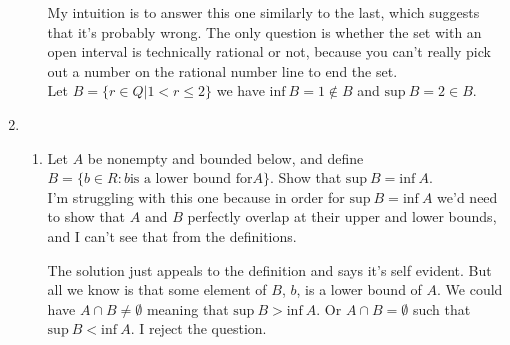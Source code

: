 \documentclass{article}
\numberwithin{equation}{subsection}
\theoremstyle{definition}
\begin{document}
\begin{enumerate}
\begin{enumerate}
                My intuition is to answer this one similarly to the last, which suggests
                that it's probably wrong. The only question is whether the set with an
                open interval is technically rational or not, because you can't really
                pick out a number on the rational number line to end the set. \\

                Let $B = \{r \in Q | 1 < r \leq 2\}$ we have $\text{inf}~B = 1 \notin B$
                and $\text{sup}~B = 2 \in B$.

        \end{enumerate}

    \item 
        \begin{enumerate}
            \item Let $A$ be nonempty and bounded below, and define $B = \{b \in R: b
                \text{is a lower bound for} A\}$. Show that $\text{sup}~B =
                \text{inf}~A$.\\

                I'm struggling with this one because in order for $\text{sup}~B =
                \text{inf}~A$ we'd need to show that $A$ and $B$ perfectly overlap at
                their upper and lower bounds, and I can't see that from the definitions.

                The solution just appeals to the definition and says it's self evident.
                But all we know is that some element of $B$, $b$, is a lower bound of $A$.
                We could have $A \cap B \neq \emptyset$ meaning that $\text{sup}~B >
                \text{inf}~A$. Or $A \cap B = \emptyset$ such that $\text{sup}~B <
                    \text{inf}~A$. I reject the question.

        \end{enumerate}

\end{enumerate}
\end{document}
